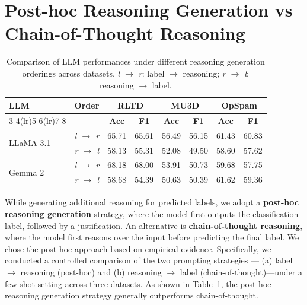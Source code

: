\section{Post-hoc Reasoning Generation vs Chain-of-Thought Reasoning}
\label{cot}

\begin{table}
\centering
\small
\begin{tabular}{l c cc cc cc}
\toprule
\textbf{LLM} 
  & \textbf{Order}
  & \multicolumn{2}{c}{\textbf{RLTD}}
  & \multicolumn{2}{c}{\textbf{MU3D}}
  & \multicolumn{2}{c}{\textbf{OpSpam}} \\
\cmidrule(lr){3-4}\cmidrule(lr){5-6}\cmidrule(lr){7-8}
 & 
 & \textbf{Acc} & \textbf{F1}
 & \textbf{Acc} & \textbf{F1}
 & \textbf{Acc} & \textbf{F1} \\
\midrule

\multirow{2}{*}{LLaMA 3.1} 
  & \textit{l $\rightarrow$ r}    & 65.71 & 65.61 & 56.49 & 56.15 & 61.43 & 60.83 \\
  &\textit{r $\rightarrow$ l}    & 58.13 & 55.31 & 52.08 & 49.50 & 58.60 & 57.62 \\
\midrule

\multirow{2}{*}{Gemma 2} 
  & \textit{l $\rightarrow$ r}    & 68.18 & 68.00 & 53.91 & 50.73 & 59.68 & 57.75 \\
  & \textit{r $\rightarrow$ l}    & 58.68 & 54.39 & 50.63 & 50.39 & 61.62 & 59.36 \\
\bottomrule
\end{tabular}
\caption{Comparison of LLM performances under different reasoning generation orderings across datasets. \textit{l $\rightarrow$ r}: label $\rightarrow$ reasoning; \textit{r $\rightarrow$ l}: reasoning $\rightarrow$ label.}
\label{tab:cot}
\end{table}


While generating additional reasoning for predicted labels, we adopt a \textbf{post-hoc reasoning generation} strategy, where the model first outputs the classification label, followed by a justification. An alternative is \textbf{chain-of-thought reasoning}, where the model first reasons over the input before predicting the final label. We chose the post-hoc approach based on empirical evidence. Specifically, we conducted a controlled comparison of the two prompting strategies — (a) label $\rightarrow$ reasoning (post-hoc) and (b) reasoning $\rightarrow$ label (chain-of-thought)—under a few-shot setting across three datasets. As shown in Table~\ref{tab:cot}, the post-hoc reasoning generation strategy generally outperforms chain-of-thought.


